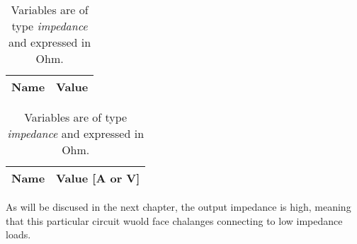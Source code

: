\begin{table}[h]
\centering
\begin{minipage}[t]{0.50\linewidth}
 	 \begin{tabular}[t]{|l|r|}
    	\hline    
   		{\bf Name} & {\bf Value} \\ \hline
    	
  	\end{tabular}
  	\caption{ Variables are of type {\it impedance} and expressed in Ohm.}
  	\label{tab:SIM_ZIN}
\end{minipage}

\begin{minipage}[t]{0.50\linewidth}
  	\begin{tabular}[t]{|l|r|}
    	\hline    
   		{\bf Name} & {\bf Value [A or V]} \\ \hline
    	
  	\end{tabular}
	\caption{ Variables are of type {\it impedance} and expressed in Ohm.}
  	\label{tab:SIM_ZOUT}
\end{minipage}
\end{table}

As will be discused in the next chapter, the output impedance is high, meaning that this particular circuit wuold face chalanges connecting to low impedance loads.